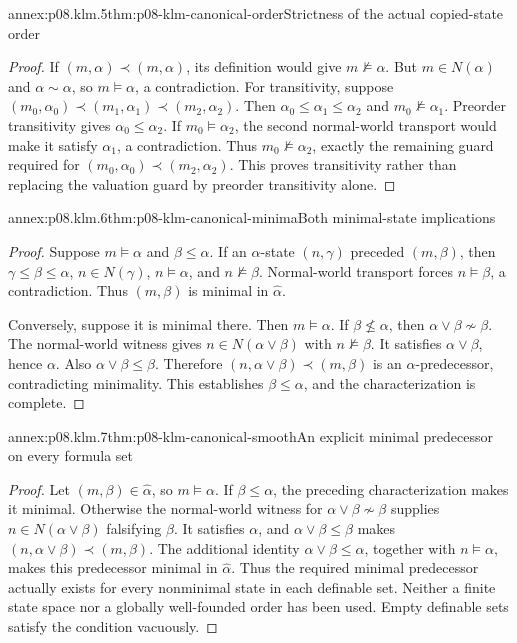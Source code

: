 \begin{annexitem}{annex:p08.klm.5}{thm:p08-klm-canonical-order}{Strictness of the actual copied-state order}
\begin{proof}
If \((m,\alpha)\prec(m,\alpha)\), its definition would give
\(m\not\models\alpha\). But \(m\in N(\alpha)\) and
\(\alpha\sim\alpha\), so \(m\models\alpha\), a contradiction.
For transitivity, suppose
\((m_0,\alpha_0)\prec(m_1,\alpha_1)\prec(m_2,\alpha_2)\).
Then \(\alpha_0\leq\alpha_1\leq\alpha_2\) and
\(m_0\not\models\alpha_1\). Preorder transitivity gives
\(\alpha_0\leq\alpha_2\). If \(m_0\models\alpha_2\), the
second normal-world transport would make it satisfy \(\alpha_1\),
a contradiction. Thus \(m_0\not\models\alpha_2\), exactly the
remaining guard required for
\((m_0,\alpha_0)\prec(m_2,\alpha_2)\).
This proves transitivity rather than replacing the valuation guard by
preorder transitivity alone.
\end{proof}
\end{annexitem}

\begin{annexitem}{annex:p08.klm.6}{thm:p08-klm-canonical-minima}{Both minimal-state implications}
\begin{proof}
Suppose \(m\models\alpha\) and \(\beta\leq\alpha\).
If an \(\alpha\)-state \((n,\gamma)\) preceded \((m,\beta)\),
then \(\gamma\leq\beta\leq\alpha\), \(n\in N(\gamma)\),
\(n\models\alpha\), and \(n\not\models\beta\).
Normal-world transport forces \(n\models\beta\), a contradiction.
Thus \((m,\beta)\) is minimal in \(\widehat\alpha\).

Conversely, suppose it is minimal there. Then \(m\models\alpha\).
If \(\beta\not\leq\alpha\), then
\(\alpha\vee\beta\not\sim\beta\). The normal-world witness
gives \(n\in N(\alpha\vee\beta)\) with \(n\not\models\beta\).
It satisfies \(\alpha\vee\beta\), hence \(\alpha\).
Also \(\alpha\vee\beta\leq\beta\). Therefore
\((n,\alpha\vee\beta)\prec(m,\beta)\) is an
\(\alpha\)-predecessor, contradicting minimality. This establishes
\(\beta\leq\alpha\), and the characterization is complete.
\end{proof}
\end{annexitem}

\begin{annexitem}{annex:p08.klm.7}{thm:p08-klm-canonical-smooth}{An explicit minimal predecessor on every formula set}
\begin{proof}
Let \((m,\beta)\in\widehat\alpha\), so \(m\models\alpha\).
If \(\beta\leq\alpha\), the preceding characterization makes it
minimal. Otherwise the normal-world witness for
\(\alpha\vee\beta\not\sim\beta\) supplies
\(n\in N(\alpha\vee\beta)\) falsifying \(\beta\).
It satisfies \(\alpha\), and
\(\alpha\vee\beta\leq\beta\) makes
\((n,\alpha\vee\beta)\prec(m,\beta)\).
The additional identity \(\alpha\vee\beta\leq\alpha\), together
with \(n\models\alpha\), makes this predecessor minimal in
\(\widehat\alpha\). Thus the required minimal predecessor actually
exists for every nonminimal state in each definable set.
Neither a finite state space nor a globally well-founded order has been
used. Empty definable sets satisfy the condition vacuously.
\end{proof}
\end{annexitem}

